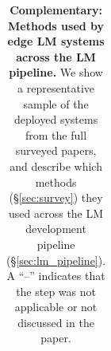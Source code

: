\begin{table}[ht]
{\begin{tabular}{p{3cm} p{2.5cm} p{2.5cm} p{2.5cm} p{2.5cm} p{2.5cm}}
    \bottomrule
        \end{tabular}}
    \caption{
        \textbf{Complementary: Methods used by edge LM systems across the LM pipeline.}
        We show a representative sample of the \numdeploymentpapers{} deployed systems from the full \numpapers{} surveyed papers, and describe which methods (\S\ref{sec:survey}) they used across the LM development pipeline (\S\ref{sec:lm_pipeline}).
        A ``--'' indicates that the step was not applicable or not discussed in the paper.
    }
    \label{tab:lm_pipeline_edge_lm_systems}
\end{table}